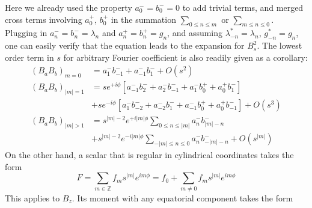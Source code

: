 \documentclass[a4paper, 11pt]{article}
\begin{document}
Here we already used the property $a_0^- = b_0^- = 0$ to add trivial terms, and merged cross terms involving $a_0^+$, $b_0^+$ in the summation $\sum_{0\leq n \leq m}$ or $\sum_{m\leq n \leq 0}$. Plugging in $a_{n}^- = b_n^- = \lambda_n$ and $a_n^+ = b_n^+ = g_n$, and assuming $\lambda_{-n}^* = \lambda_n$, $g_{-n}^* = g_n$, one can easily verify that the equation leads to the expansion for $B_s^2$. The lowest order term in $s$ for arbitrary Fourier coefficient is also readily given as a corollary:
\begin{equation}
\begin{aligned}
    \left(B_a B_b\right)_{m=0} &= a_1^- b_{-1}^- + a_{-1}^- b_{1}^- + O\left(s^2\right) \\ 
    \left(B_a B_b\right)_{|m|=1} &= s e^{+i\phi}\left[a_{-1}^- b_{2}^- + a_{2}^- b_{-1}^- + a_1^- b_0^+ + a_0^+ b_1^-\right]\\
    &+ s e^{-i\phi}\left[a_{1}^- b_{-2}^- + a_{-2}^- b_{1}^- + a_{-1}^- b_0^+ + a_0^+ b_{-1}^-\right] + O\left(s^3\right) \\ 
    \left(B_a B_b\right)_{|m|>1} &= s^{|m|-2} e^{+i|m|\phi} \sum_{0\leq n \leq |m|} a_n^- b_{|m|-n}^- \\
    &+ s^{|m|-2} e^{-i|m|\phi} \sum_{-|m| \leq n \leq 0} a_n^- b_{-|m|-n}^- + O\left(s^{|m|}\right)
\end{aligned}
\end{equation}
On the other hand, a scalar that is regular in cylindrical coordinates takes the form
\begin{equation}
F = \sum_{m\in \mathbb{Z}} f_m s^{|m|} e^{im\phi} = f_0 + \sum_{m\neq 0} f_m s^{|m|} e^{im\phi}
\end{equation}
This applies to $B_z$. Its moment with any equatorial component takes the form
\end{document}
